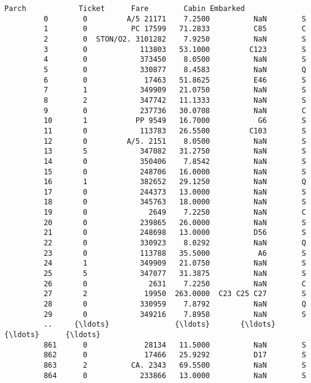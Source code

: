 \documentclass[11pt]{article}
\begin{document}
\begin{Verbatim}[commandchars=\\\{\}]
              Parch            Ticket      Fare        Cabin Embarked  
         0        0         A/5 21171    7.2500          NaN        S  
         1        0          PC 17599   71.2833          C85        C  
         2        0  STON/O2. 3101282    7.9250          NaN        S  
         3        0            113803   53.1000         C123        S  
         4        0            373450    8.0500          NaN        S  
         5        0            330877    8.4583          NaN        Q  
         6        0             17463   51.8625          E46        S  
         7        1            349909   21.0750          NaN        S  
         8        2            347742   11.1333          NaN        S  
         9        0            237736   30.0708          NaN        C  
         10       1           PP 9549   16.7000           G6        S  
         11       0            113783   26.5500         C103        S  
         12       0         A/5. 2151    8.0500          NaN        S  
         13       5            347082   31.2750          NaN        S  
         14       0            350406    7.8542          NaN        S  
         15       0            248706   16.0000          NaN        S  
         16       1            382652   29.1250          NaN        Q  
         17       0            244373   13.0000          NaN        S  
         18       0            345763   18.0000          NaN        S  
         19       0              2649    7.2250          NaN        C  
         20       0            239865   26.0000          NaN        S  
         21       0            248698   13.0000          D56        S  
         22       0            330923    8.0292          NaN        Q  
         23       0            113788   35.5000           A6        S  
         24       1            349909   21.0750          NaN        S  
         25       5            347077   31.3875          NaN        S  
         26       0              2631    7.2250          NaN        C  
         27       2             19950  263.0000  C23 C25 C27        S  
         28       0            330959    7.8792          NaN        Q  
         29       0            349216    7.8958          NaN        S  
         ..     {\ldots}               {\ldots}       {\ldots}          {\ldots}      {\ldots}  
         861      0             28134   11.5000          NaN        S  
         862      0             17466   25.9292          D17        S  
         863      2          CA. 2343   69.5500          NaN        S  
         864      0            233866   13.0000          NaN        S  

\end{Verbatim}
\end{document}
